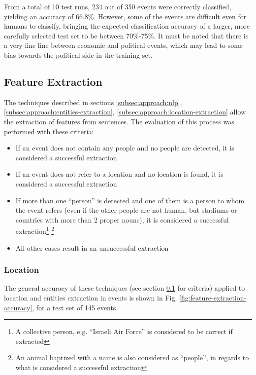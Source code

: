 \documentclass{llncs}
\begin{document}
From a total of 10 test runs, 234 out of 350 events were correctly classified, yielding an accuracy of 66.8\%. However, some of the events are difficult even for humans to classify, bringing the expected classification accuracy of a larger, more carefully selected test set to be between 70\%-75\%. It must be noted that there is a very fine line between economic and political events, which may lead to some bias towards the political side in the training set.

\subsection{Feature Extraction}
\label{subsec:results:features-extraction}

The techniques described in sections \ref{subsec:approach:nlp}, \ref{subsec:approach:entities-extraction}, \ref{subsec:approach:location-extraction} allow the extraction of features from sentences. The evaluation of this process was performed with these criteria:

\begin{itemize}
	\item If an event does not contain any people and no people are detected, it is considered a successful extraction
	\item If an event does not refer to a location and no location is found, it is considered a successful extraction
	\item If more than one ``person'' is detected and one of them is a person to whom the event refers (even if the other people are not human, but stadiums or countries with more than 2 proper nouns), it is considered a successful extraction\footnote{A collective person, e.g. ``Israeli Air Force'' is considered to be correct if extracted} \footnote{An animal baptized with a name is also considered as ``people'', in regards to what is considered a successful extraction}
	\item All other cases result in an unsuccessful extraction
\end{itemize}

\subsubsection{Location}

The general accuracy of these techniques (see section \ref{subsec:results:features-extraction} for criteria) applied to location and entities extraction in events is shown in Fig. \ref{fig:feature-extraction-accuracy}, for a test set of 145 events.
\end{document}
